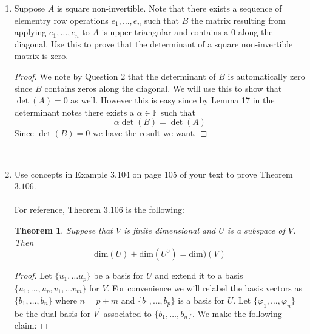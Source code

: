 \documentclass[12pt,letterpaper]{article}
\theoremstyle{plain}
\newtheorem*{theorem*}{Theorem}
\theoremstyle{definition}
\begin{document}
\begin{enumerate}[1.]
\begin{proof}
Suppose that $A$ is nilpotent and that $A^k=0$ for some $k\in \mathbb{N}$. I will break the proof into two versions. In one version, the field should be either $\mathbb{C}$ or $\mathbb{R}$. In the second version, any field will work. I will accept either version as correct.  \\
\ \\
{\bf Version 1: }If $A^k=0$ then $\det(A^k)=\det(0)=0$. By the multiplicative property we have that 
\[\det(A)^k=0\] and hence 
\[\det(A)=0\]
by taking $k$-th roots. \\
\ \\
{\bf Version 2: }Suppose that $A$ is nilpotent but has a non-zero determinant. By the question above and the question below we have that $A$ must be invertible. Let $A^{-1}$ denote its inverse. Let $k$ be the smallest positive integer such that $A^k=0$.  
\[I=A^{-1}A\]
\[A^{k-1}=IA^{k-1}=A^{-1}AA^{k-1}=A^{-1}A^{k}=A^{-1}0=0\]
Which is a contradiction on the condition we put on $k$. 
\end{proof}
\ \\
\item Suppose $A$ is square non-invertible. Note that there exists a sequence of elementry row operations $e_1,\ldots ,e_n$ such that 
$B$ the matrix resulting from applying $e_1,\ldots, e_n$ to $A$ is upper triangular and contains a $0$ along the diagonal. Use this to prove that the determinant of a square non-invertible matrix is zero. \\
\begin{proof} We note by Question 2 that the determinant of $B$ is automatically zero since $B$ contains zeros along the diagonal. We will use this to show that $\det(A)=0$ as well. However this is easy since by Lemma 17 in the determinant notes there exists a $\alpha\in \mathbb{F}$ such that 
\[\alpha\det(B)=\det(A)\]
Since $\det(B)=0$ we have the result we want. 
\end{proof}
\ \\
\item Use concepts in Example 3.104 on page 105 of your text to prove Theorem $3.106$.\\
\ \\
For reference, Theorem 3.106 is the following:
\begin{theorem*} Suppose that $V$ is finite dimensional and $U$ is a subspace of $V$. Then 
\[\text{dim}(U)+\text{dim}(U^0)=\text{dim})(V)\]
\end{theorem*}
\begin{proof}Let $\{u_1, \ldots u_p\}$ be a basis for $U$ and extend it to a basis $\{u_1, \ldots, u_p, v_1, \ldots v_m\}$ for $V$. For convenience we will relabel the basis vectors as $\{b_1, \ldots, b_n\}$ where $n=p+m$ and $\{b_1, \ldots, b_p\}$ is a basis for $U$. Let $\{\varphi_1, \ldots, \varphi_n\}$ be the dual basis for $V^\prime$ associated to $\{b_1, \ldots, b_n\}$. We make the following claim:

\end{proof}
\end{enumerate}
\end{document}

